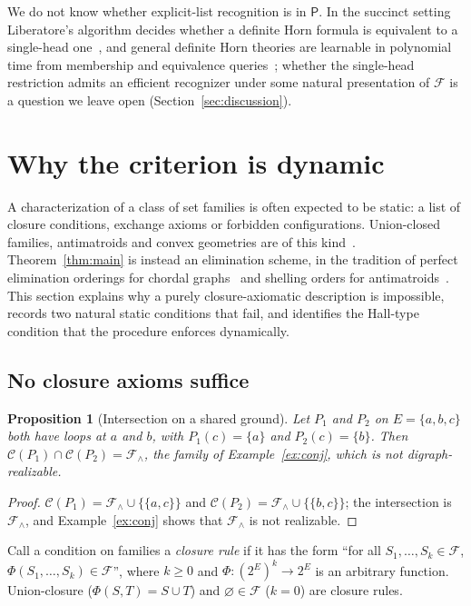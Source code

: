 \documentclass[11pt,a4paper]{article}
\theoremstyle{plain}
\newtheorem{proposition}[theorem]{Proposition}
\theoremstyle{definition}
\theoremstyle{remark}
\newcommand{\cC}{\mathcal C}
\newcommand{\cF}{\mathcal F}
\newcommand{\pw}[1]{2^{#1}}
\newcommand{\Ptime}{\mathsf{P}}
\begin{document}
We do not know whether explicit-list recognition is in $\Ptime$. In the succinct setting Liberatore's algorithm decides whether a definite Horn formula is equivalent to a single-head one~\cite[Theorem~4.1]{liberatore2023reconstructing}, and general definite Horn theories are learnable in polynomial time from membership and equivalence queries~\cite{angluin1992learning}; whether the single-head restriction admits an efficient recognizer under some natural presentation of $\cF$ is a question we leave open (Section~\ref{sec:discussion}).

\section{Why the criterion is dynamic}\label{sec:dynamic}

A characterization of a class of set families is often expected to be static: a list of closure conditions, exchange axioms or forbidden configurations. Union-closed families, antimatroids and convex geometries are of this kind~\cite{korte1991greedoids,edelman1985theory}. Theorem~\ref{thm:main} is instead an elimination scheme, in the tradition of perfect elimination orderings for chordal graphs~\cite{fulkerson1965incidence} and shelling orders for antimatroids~\cite{korte1991greedoids}. This section explains why a purely closure-axiomatic description is impossible, records two natural static conditions that fail, and identifies the Hall-type condition that the procedure enforces dynamically.

\subsection{No closure axioms suffice}

\begin{proposition}[Intersection on a shared ground]\label{prop:intersection}
Let $P_1$ and $P_2$ on $E=\{a,b,c\}$ both have loops at $a$ and $b$, with $P_1(c)=\{a\}$ and $P_2(c)=\{b\}$. Then $\cC(P_1)\cap\cC(P_2)=\cF_\wedge$, the family of Example~\ref{ex:conj}, which is not digraph-realizable.
\end{proposition}

\begin{proof}
$\cC(P_1)=\cF_\wedge\cup\{\{a,c\}\}$ and $\cC(P_2)=\cF_\wedge\cup\{\{b,c\}\}$; the intersection is $\cF_\wedge$, and Example~\ref{ex:conj} shows that $\cF_\wedge$ is not realizable.
\end{proof}

Call a condition on families a \emph{closure rule} if it has the form ``for all $S_1,\dots,S_k\in\cF$, $\Phi(S_1,\dots,S_k)\in\cF$'', where $k\ge0$ and $\Phi:(\pw{E})^{k}\to\pw{E}$ is an arbitrary function. Union-closure ($\Phi(S,T)=S\cup T$) and $\varnothing\in\cF$ ($k=0$) are closure rules.
\end{document}
